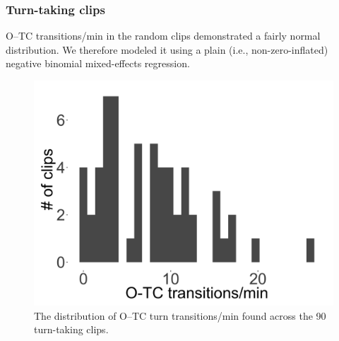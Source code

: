 \documentclass[floatsintext,man]{apa6}
\theoremstyle{definition}
\theoremstyle{definition}
\theoremstyle{definition}
\theoremstyle{remark}
\begin{document}
\FloatBarrier

\subsubsection{Turn-taking clips}\label{models-o_tc-turntaking}

O--TC transitions/min in the random clips demonstrated a fairly normal
distribution. We therefore modeled it using a plain (i.e.,
non-zero-inflated) negative binomial mixed-effects regression.

\FloatBarrier

\begin{figure}[H]

{\centering \includegraphics[width=0.4\linewidth]{www/o_c_tpm_turntaking_distribution} 

}

\caption{The distribution of O--TC turn transitions/min found across the 90 turn-taking clips.}\label{fig:fig22}
\end{figure}

\FloatBarrier
\end{document}
